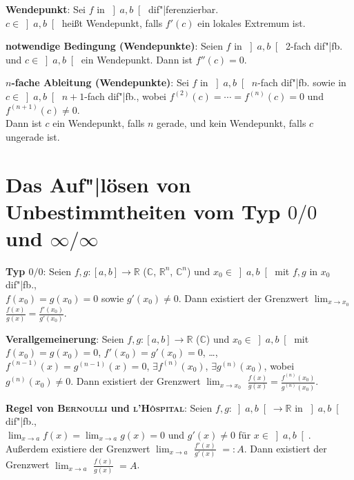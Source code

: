 \linie

\textbf{Wendepunkt}:
Sei $f$ in $\left]a,b\right[$ dif"|ferenzierbar. \\
$c \in \left]a,b\right[$ heißt Wendepunkt, falls $f'(c)$ ein lokales Extremum
ist.

\textbf{notwendige Bedingung (Wendepunkte)}:
Seien $f$ in $\left]a,b\right[$ 2-fach dif"|fb. und $c \in \left]a,b\right[$
ein Wendepunkt. \qquad
Dann ist $f''(c) = 0$.

\textbf{$n$-fache Ableitung (Wendepunkte)}:
Sei $f$ in $\left]a,b\right[$ $n$-fach dif"|fb. sowie in
$c \in \left]a,b\right[$ $n+1$-fach dif"|fb., wobei
$f^{(2)}(c) = \cdots = f^{(n)}(c) = 0$ und $f^{(n+1)}(c) \not= 0$. \\
Dann ist $c$ ein Wendepunkt, falls $n$ gerade, und kein Wendepunkt, falls
$c$ ungerade ist.

\pagebreak

\section{%
    \texorpdfstring
    {Das Auf"|lösen von Unbestimmtheiten vom Typ $0/0$ und $\infty/\infty$}%
    {Das Auf"|lösen von Unbestimmtheiten vom Typ 0/0 und ∞/∞}%
}

\textbf{Typ $0/0$}:
Seien $f, g: [a,b] \rightarrow \mathbb{R}$ ($\mathbb{C}$, $\mathbb{R}^n$,
$\mathbb{C}^n$) und $x_0 \in \left]a,b\right[$ mit $f, g$ in $x_0$ dif"|fb., \\
$f(x_0) = g(x_0) = 0$
sowie $g'(x_0) \not= 0$. \qquad
Dann existiert der Grenzwert $\lim_{x \to x_0}$
{\large $\frac{f(x)}{g(x)} = \frac{f'(x_0)}{g'(x_0)}$}.

\textbf{Verallgemeinerung}:
Seien $f, g: [a,b] \rightarrow \mathbb{R}$ ($\mathbb{C}$) und
$x_0 \in \left]a,b\right[$ mit $f(x_0) = g(x_0) = 0$,
$f'(x_0) = g'(x_0) = 0$, \dots, $f^{(n-1)}(x) = g^{(n-1)}(x) = 0$,
$\exists f^{(n)}(x_0)$, $\exists g^{(n)}(x_0)$, wobei $g^{(n)}(x_0) \not= 0$.
Dann existiert der Grenzwert $\lim_{x \to x_0}$
{\large $\frac{f(x)}{g(x)} = \frac{f^{(n)}(x_0)}{g^{(n)}(x_0)}$}.

\linie

\textbf{Regel von \textsc{Bernoulli} und \textsc{l'Hôspital}}:
Seien $f, g: \left]a,b\right[ \rightarrow \mathbb{R}$ in $\left]a,b\right[$
dif"|fb., \\
$\lim_{x \to a} f(x) = \lim_{x \to a} g(x) = 0$ und $g'(x) \not= 0$
für $x \in \left]a,b\right[$.
Außerdem existiere der Grenzwert $\lim_{x \to a}$%
{\large $\frac{f'(x)}{g'(x)}$} $=: A$. \qquad
Dann existiert der Grenzwert $\lim_{x \to a}$%
{\large $\frac{f(x)}{g(x)}$} $= A$.

